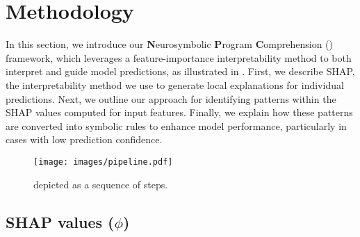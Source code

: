 \section{Methodology}
\label{sec:approach}



In this section, we introduce our \textbf{N}eurosymbolic \textbf{P}rogram \textbf{C}omprehension (\framework) framework, which leverages a feature-importance interpretability method to both interpret and guide model predictions, as illustrated in . First, we describe SHAP, the interpretability method we use to generate local explanations for individual predictions. Next, we outline our approach for identifying patterns within the SHAP values computed for input features. Finally, we explain how these patterns are converted into symbolic rules to enhance model performance, particularly in cases with low prediction confidence.


\begin{figure}[ht]
		\centering
  \vspace{-1.5em}
  \texttt{[image: images/pipeline.pdf]}
		\caption{\framework depicted as a sequence of steps.}
    \label{fig:npc_pipeline}
    \vspace{-1em}
\end{figure}




\subsection{SHAP values ($\phi$)}

